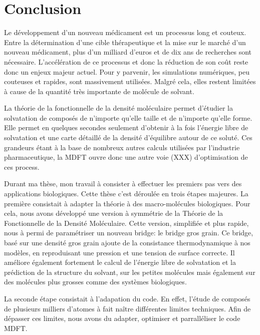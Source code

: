 \chapter{Conclusion}
\label{chap:conclusion}
Le développement d'un nouveau médicament est un processus long et couteux. Entre la détermination d'une cible thérapeutique et la mise sur le marché d'un nouveau médicament, plus d'un milliard d'euros et de dix ans de recherches sont nécessaire.
L'accélération de ce processus et donc la réduction de son coût reste donc un enjeux majeur actuel. Pour y parvenir, les simulations numériques, peu couteuses et rapides, sont massivement utilisées. Malgré cela, elles restent limitées à cause de la quantité très importante de molécule de solvant.


La théorie de la fonctionnelle de la densité moléculaire permet d'étudier la solvatation de composés de n'importe qu'elle taille et de n'importe qu'elle forme. Elle permet en quelques secondes seulement d'obtenir à la fois l'énergie libre de solvatation et une carte détaillé de la densité d'équilibre autour de ce soluté.
Ces grandeurs étant à la base de nombreux autres calculs utilisées par l'industrie pharmaceutique, la MDFT ouvre donc une autre voie (XXX) d'optimisation de ces process.


Durant ma thèse, mon travail à consister à effectuer les premiers pas vers des applications biologiques. Cette thèse c'est déroulée en trois étapes majeures. La première consistait à adapter la théorie à des macro-molécules biologiques. Pour cela, nous avons développé une version à symmétrie de la Théorie de la Fonctionnelle de la Densité Moléculaire. Cette version, simplifiée et plus rapide, nous à permi de paramétriser un nouveau bridge: le bridge gros grain.
Ce bridge, basé sur une densité gros grain ajoute de la consistance thermodynamique à nos modèles, en reproduisant une pression et une tension de surface correcte. Il améliore également fortement le calcul de l’énergie libre de solvatation et la prédiction de la structure du solvant, sur les petites molécules mais également sur des molécules plus grosses comme des systèmes biologiques.


La seconde étape consistait à l'adapation du code. En effet, l'étude de composés de plusieurs milliers d'atomes à fait naître différentes limites techniques. Afin de dépasser ces limites, nous avons du adapter, optimiser et parralléliser le code MDFT.


